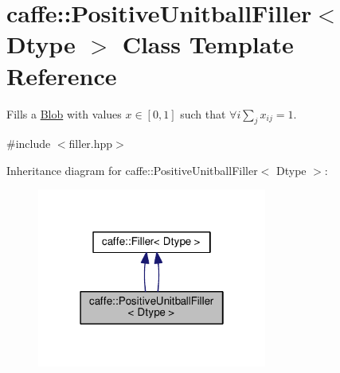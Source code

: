 \hypertarget{classcaffe_1_1_positive_unitball_filler}{}\section{caffe\+:\+:Positive\+Unitball\+Filler$<$ Dtype $>$ Class Template Reference}
\label{classcaffe_1_1_positive_unitball_filler}


Fills a \mbox{\hyperlink{classcaffe_1_1_blob}{Blob}} with values $ x \in [0, 1] $ such that $ \forall i \sum_j x_{ij} = 1 $.  




{\ttfamily \#include $<$filler.\+hpp$>$}



Inheritance diagram for caffe\+:\+:Positive\+Unitball\+Filler$<$ Dtype $>$\+:
\nopagebreak
\begin{figure}[H]
\begin{center}
\leavevmode
\includegraphics[width=214pt]{classcaffe_1_1_positive_unitball_filler__inherit__graph}
\end{center}
\end{figure}
